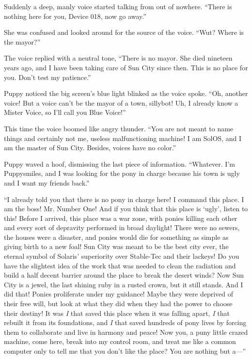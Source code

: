 Suddenly a deep, manly voice started talking from out of nowhere. ``There is nothing here for you, Device 018, now go away.''

She was confused and looked around for the source of the voice. ``Wut? Where is the mayor?''

The voice replied with a neutral tone, ``There is no mayor. She died nineteen years ago, and I have been taking care of Sun City since then. This is no place for you. Don't test my patience.''

Puppy noticed the big screen's blue light blinked as the voice spoke. ``Oh, another voice! But a voice can't be the mayor of a town, sillybot! Uh, I already know a Mister Voice, so I'll call you Blue Voice!''

This time the voice boomed like angry thunder. ``You are not meant to name things and certainly not me, useless malfunctioning machine! I am SolOS, and I am the master of Sun City. Besides, voices have no color.''

Puppy waved a hoof, dismissing the last piece of information. ``Whatever. I'm Puppysmiles, and I was looking for the pony in charge because his town is ugly and I want my friends back.''

``I already told you that there is no pony in charge here! I command this place. I am the boss! Mr. Number One! And if you think that this place is `ugly', listen to this! Before I arrived, this place was a war zone, with ponies killing each other and every sort of depravity performed in broad daylight! There were no sewers, the houses were a disaster, and ponies would die for something as simple as giving birth to a new foal! Sun City was meant to be the best city ever, the eternal symbol of Solaris' superiority over Stable-Tec and their lackeys! Do you have the slightest idea of the work that was needed to clean the radiation and build a half decent barrier around the place to break the desert winds? Now Sun City is a jewel, the last shining ruby in a rusted crown, but it still stands. And I did that! Ponies proliferate under my guidance! Maybe they were deprived of their free will, but look at what they did when they had the power to choose their destiny! It was \emph{I}\/ that saved this place when it was falling apart, \emph{I}\/ that rebuilt it from its foundations, and \emph{I}\/ that saved hundreds of pony lives by forcing them to collaborate and live in harmony and peace! Now you, a puny little crazed machine, come here, break into my control room, and treat me like a common computer only to tell me that you don't like the place? You are nothing but a---''

